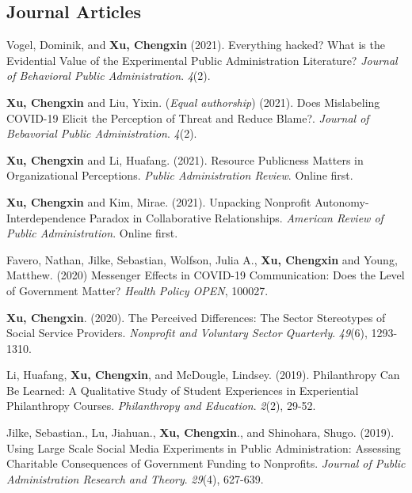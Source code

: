 \documentclass[letterpaper]{article}
\begin{document}
\subsection*{Journal Articles}

\begin{etaremune}

\item Vogel, Dominik, and \textbf{Xu, Chengxin} (2021). Everything hacked? What is the Evidential Value of the Experimental Public Administration Literature? {\it Journal of Behavioral Public Administration}. {\it 4}(2).

\item \textbf{Xu, Chengxin} and Liu, Yixin. ({\it Equal authorship}) (2021). Does Mislabeling COVID-19 Elicit the Perception of Threat and Reduce Blame?.  {\it Journal of Bebavorial Public Administration}. {\it 4}(2).

\item \textbf{Xu, Chengxin} and Li, Huafang. (2021). Resource Publicness Matters in Organizational Perceptions.  {\it Public Administration Review}. Online first.

\item \textbf{Xu, Chengxin} and Kim, Mirae. (2021). Unpacking Nonprofit Autonomy-Interdependence Paradox in Collaborative Relationships. {\it American Review of Public Administration}. Online first.

\item Favero, Nathan, Jilke, Sebastian, Wolfson, Julia A., \textbf{Xu, Chengxin} and Young, Matthew. (2020) Messenger Effects in COVID-19 Communication: Does the Level of Government Matter? {\it Health Policy OPEN}, 100027. 

\item \textbf{Xu, Chengxin}. (2020). The Perceived Differences: The Sector Stereotypes of Social Service Providers. {\it Nonprofit and Voluntary Sector Quarterly}.	{\it 49}(6), 1293-1310.

\item Li, Huafang, \textbf{Xu, Chengxin}, and McDougle, Lindsey. (2019). Philanthropy Can Be Learned: A Qualitative Study of Student Experiences in Experiential Philanthropy Courses. {\it Philanthropy and Education}. {\it 2}(2), 29-52.

\item Jilke, Sebastian., Lu, Jiahuan., \textbf{Xu, Chengxin}., and Shinohara, Shugo. (2019). Using Large Scale Social Media Experiments in Public Administration: Assessing Charitable Consequences of Government Funding to Nonprofits. {\it Journal of Public Administration Research and Theory}. {\it 29}(4), 627-639.


\end{etaremune}
\end{document}
